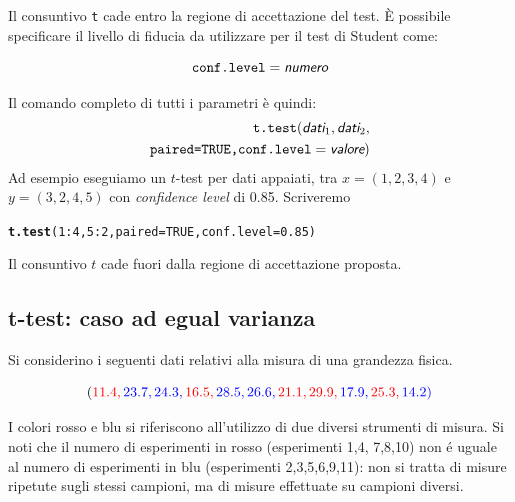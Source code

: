 \documentclass[onecolumn,12pt]{book}\usepackage[]{graphicx}\usepackage[]{color}
\makeatletter
\newcommand{\hlnum}[1]{\textcolor[rgb]{0.686,0.059,0.569}{#1}}%
\newcommand{\hlopt}[1]{\textcolor[rgb]{0,0,0}{#1}}%
\newcommand{\hlstd}[1]{\textcolor[rgb]{0.345,0.345,0.345}{#1}}%
\newcommand{\hlkwc}[1]{\textcolor[rgb]{0.333,0.667,0.333}{#1}}%
\newcommand{\hlkwd}[1]{\textcolor[rgb]{0.737,0.353,0.396}{\textbf{#1}}}%
\newenvironment{kframe}{%
 \def\at@end@of@kframe{}%
 \ifinner\ifhmode%
  \def\at@end@of@kframe{\end{minipage}}%
  \begin{minipage}{\columnwidth}%
 \fi\fi%
 \def\FrameCommand##1{\hskip\@totalleftmargin \hskip-\fboxsep
 \colorbox{shadecolor}{##1}\hskip-\fboxsep
     \hskip-\linewidth \hskip-\@totalleftmargin \hskip\columnwidth}%
 \MakeFramed {\advance\hsize-\width
   \@totalleftmargin\z@ \linewidth\hsize
   \@setminipage}}%
 {\par\unskip\endMakeFramed%
 \at@end@of@kframe}
\newenvironment{knitrout}{}{} %
\newcommand{\varia}[1]{\textsl{\textsf{#1}}}
\makeatother
\begin{document}
Il consuntivo   \texttt{t} cade entro la regione di accettazione del test.
\`E  possibile specificare il livello di fiducia da utilizzare per il test di Student come:

$$\texttt{conf.level}=\varia{numero}$$

Il comando completo di tutti i parametri  \`e quindi:
\begin{eqnarray*}
\texttt{t.test}(\varia{dati}_1,\varia{dati}_2,
\\
\texttt{paired=TRUE,conf.level}=\varia{valore})
\end{eqnarray*}
Ad esempio eseguiamo un $t$-test per dati appaiati, tra $x=(1,2,3,4)$ e $y=(3,2,4,5)$ con {\it confidence level} di 0.85. Scriveremo
\begin{knitrout}
\color{fgcolor}\begin{kframe}
\begin{alltt}
\hlkwd{t.test}\hlstd{(}\hlnum{1}\hlopt{:}\hlnum{4}\hlstd{,}\hlnum{5}\hlopt{:}\hlnum{2}\hlstd{,}\hlkwc{paired}\hlstd{=}\hlnum{TRUE}\hlstd{,}\hlkwc{conf.level}\hlstd{=}\hlnum{0.85}\hlstd{)}
\end{alltt}
\end{kframe}
\end{knitrout}
 Il consuntivo $t$ cade fuori dalla regione di accettazione proposta.


\subsection{t-test: caso ad egual varianza}

Si considerino i seguenti dati relativi alla misura di una grandezza fisica.


\[(
\color{red}{11.4},\color{blue}{23.7},\color{blue}{24.3},\color{red}{16.5},\color{blue}{28.5},
\color{blue}{26.6},\color{red}{21.1},\color{red}{29.9},\color{blue}{17.9},\color{red}{25.3},\color{blue}{14.2})\]


I colori rosso e blu si riferiscono all'utilizzo di due diversi strumenti di misura. Si noti che il numero di esperimenti in rosso (esperimenti 1,4, 7,8,10) non é uguale al numero di esperimenti in blu (esperimenti 2,3,5,6,9,11): non si tratta di misure ripetute sugli stessi campioni, ma di misure effettuate su campioni diversi.
\end{document}
